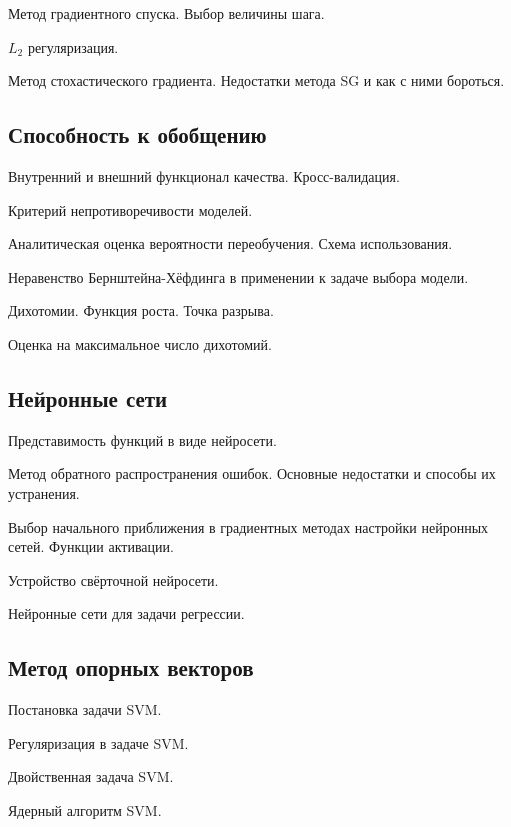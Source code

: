 \documentclass[a4paper,12pt]{article}
\begin{document}
  \myparagraph Метод градиентного спуска. Выбор величины шага.
  
  \myparagraph $L_2$ регуляризация.

  \myparagraph Метод стохастического градиента. Недостатки метода SG и как с ними бороться.  

  \subsection*{Способность к обобщению}
  
  \myparagraph Внутренний и внешний функционал качества. Кросс-валидация. 
  
  \myparagraph Критерий непротиворечивости моделей.

  \myparagraph Аналитическая оценка вероятности переобучения. Схема использования. 
  
  \myparagraph Неравенство Бернштейна-Хёфдинга в применении к задаче выбора модели.
  
  \myparagraph Дихотомии. Функция роста. Точка разрыва.
  
  \myparagraph Оценка на максимальное число дихотомий.
  
  \subsection*{Нейронные сети}
  
  \myparagraph Представимость функций в виде нейросети.
  
  \myparagraph Метод обратного распространения ошибок. Основные недостатки и способы их устранения.

  \myparagraph Выбор начального приближения в градиентных методах настройки нейронных сетей. Функции активации.

  \myparagraph Устройство свёрточной нейросети.
  
  \myparagraph Нейронные сети для задачи регрессии.
  
  \subsection*{Метод опорных векторов}
  
  \myparagraph Постановка задачи SVM. 
  
  \myparagraph Регуляризация в задаче SVM. 
  
  \myparagraph Двойственная задача SVM. 

  \myparagraph Ядерный алгоритм SVM. 
  
\end{document}
